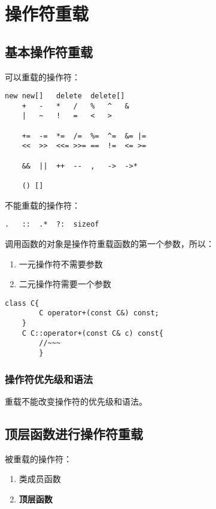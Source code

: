 \chapter{操作符重载}
\newpage

\section{基本操作符重载}

可以重载的操作符：
\begin{lstlisting}[frame=shadowbox]
    new new[]   delete  delete[]
    +   -   *   /   %   ^   &
    |   ~   !   =   <   > 

    +=  -=  *=  /=  %=  ^=  &= |=
    <<  >>  <<= >>= ==  !=  <= >=

    &&  ||  ++  --  ,   ->  ->*

    () []
\end{lstlisting}

不能重载的操作符：
\begin{lstlisting}[frame=shadowbox]
    .   ::  .*  ?:  sizeof    
\end{lstlisting}

调用函数的对象是操作符重载函数的第一个参数，所以：
\begin{enumerate}
    \item 一元操作符不需要参数
    \item 二元操作符需要一个参数
\end{enumerate}

\begin{lstlisting}[frame=shadowbox]
    class C{
        C operator+(const C&) const;
    }
    C C::operator+(const C& c) const{
        //~~~
        }
\end{lstlisting}

\subsection{操作符优先级和语法}

重载不能改变操作符的优先级和语法。

\section{顶层函数进行操作符重载}

被重载的操作符：
\begin{enumerate}
    \item 类成员函数
    \item \textbf{顶层函数}
\end{enumerate}

